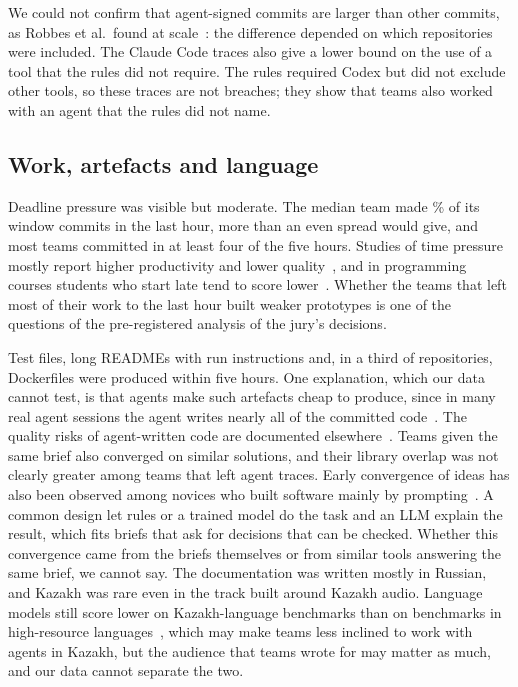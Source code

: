 \documentclass{article}
\begin{document}
We could not confirm that agent-signed commits are larger than other commits, as Robbes et al.\ found at scale~\cite{robbes2026agenticmuch}: the difference depended on which repositories were included. The Claude Code traces also give a lower bound on the use of a tool that the rules did not require. The rules required Codex but did not exclude other tools, so these traces are not breaches; they show that teams also worked with an agent that the rules did not name.

\subsection{Work, artefacts and language}
Deadline pressure was visible but moderate. The median team made \NRqTwoTeamShareMedian\% of its window commits in the last hour, more than an even spread would give, and most teams committed in at least four of the five hours. Studies of time pressure mostly report higher productivity and lower quality~\cite{kuutila2020timepressure}, and in programming courses students who start late tend to score lower~\cite{kazerouni2017procrastination}. Whether the teams that left most of their work to the last hour built weaker prototypes is one of the questions of the pre-registered analysis of the jury's decisions.

Test files, long READMEs with run instructions and, in a third of repositories, Dockerfiles were produced within five hours. One explanation, which our data cannot test, is that agents make such artefacts cheap to produce, since in many real agent sessions the agent writes nearly all of the committed code~\cite{baumann2026swechat}. The quality risks of agent-written code are documented elsewhere~\cite{he2026cursor,agarwal2026aiides,zhao2025vibesafe}. Teams given the same brief also converged on similar solutions, and their library overlap was not clearly greater among teams that left agent traces. Early convergence of ideas has also been observed among novices who built software mainly by prompting~\cite{gama2025vibes}. A common design let rules or a trained model do the task and an LLM explain the result, which fits briefs that ask for decisions that can be checked. Whether this convergence came from the briefs themselves or from similar tools answering the same brief, we cannot say. The documentation was written mostly in Russian, and Kazakh was rare even in the track built around Kazakh audio. Language models still score lower on Kazakh-language benchmarks than on benchmarks in high-resource languages~\cite{togmanov2025kazmmlu}, which may make teams less inclined to work with agents in Kazakh, but the audience that teams wrote for may matter as much, and our data cannot separate the two.
\end{document}
